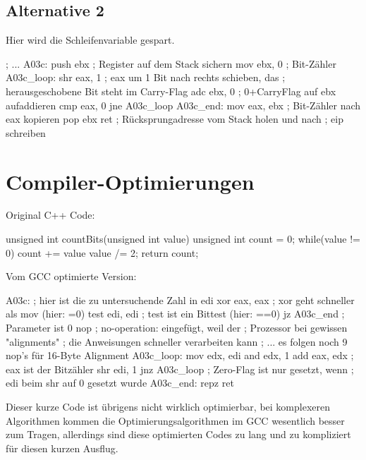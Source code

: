 \vfill{}



\subsection{\label{sub:Asm-Alternative-2}Alternative 2}

\begin{minipage}[t]{1\columnwidth}%
Hier wird die Schleifenvariable  gespart.

\begin{nasmcode}
; ...
A03c:
  push ebx ; Register auf dem Stack sichern
  mov ebx, 0 ; Bit-Zähler
A03c_loop:
  shr eax, 1 ; eax um 1 Bit nach rechts schieben, das
             ; herausgeschobene Bit steht im Carry-Flag
  adc ebx, 0 ; 0+CarryFlag auf ebx aufaddieren
  cmp eax, 0
  jne A03c_loop
A03c_end:
  mov eax, ebx ; Bit-Zähler nach eax kopieren
  pop ebx
  ret ; Rücksprungadresse vom Stack holen und nach
      ; eip schreiben
\end{nasmcode}
\end{minipage}

\vfill{}



\section{Compiler-Optimierungen}

\noindent %
\begin{minipage}[t]{1\columnwidth}%
Original C++ Code:
\begin{cppcode}
unsigned int countBits(unsigned int value) {
  unsigned int count = 0;
  while(value != 0) {
    count += value%
    value /= 2;
  }
  return count;
}
\end{cppcode}

Vom GCC optimierte Version:
\begin{nasmcode}
A03c: ; hier ist die zu untersuchende Zahl in edi
  xor eax, eax ; xor geht schneller als mov (hier: =0)
  test edi, edi ; test ist ein Bittest (hier: ==0)
  jz A03c_end ; Parameter ist 0
  nop ; no-operation: eingefügt, weil der
      ; Prozessor bei gewissen "alignments"
      ; die Anweisungen schneller verarbeiten kann
  ; ... es folgen noch 9 nop's für 16-Byte Alignment
A03c_loop:
  mov edx, edi
  and edx, 1
  add eax, edx ; eax ist der Bitzähler
  shr edi, 1
  jnz A03c_loop ; Zero-Flag ist nur gesetzt, wenn
                ; edi beim shr auf 0 gesetzt wurde
A03c_end:
  repz ret
\end{nasmcode}

Dieser kurze Code ist übrigens nicht wirklich optimierbar, bei komplexeren Algorithmen kommen die Optimierungsalgorithmen im GCC wesentlich besser zum Tragen, allerdings sind diese optimierten Codes zu lang und zu kompliziert für diesen kurzen Ausflug.%
\end{minipage}

